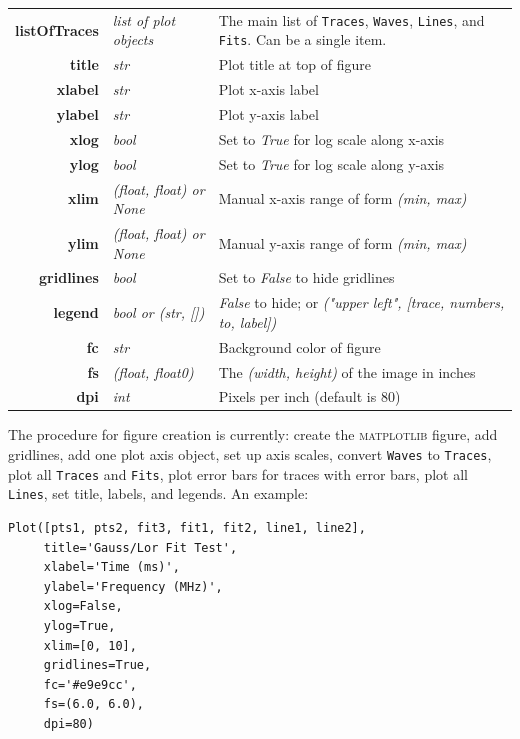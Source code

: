 \documentclass[10pt]{report}
\begin{document}
\begin{table}[hbt]\centering
\begin{tabular}{r l l}
\textbf{listOfTraces} & \textit{list of plot objects} & The main list of \texttt{Traces}, \texttt{Waves}, \texttt{Lines}, and \texttt{Fits}. Can be a single item.  \\
\textbf{title} & \textit{str} & Plot title at top of figure  \\
\textbf{xlabel} & \textit{str} & Plot x-axis label \\
\textbf{ylabel} & \textit{str} & Plot y-axis label \\
\textbf{xlog} & \textit{bool} & Set to \textit{True} for log scale along x-axis \\
\textbf{ylog} & \textit{bool} & Set to \textit{True} for log scale along y-axis \\
\textbf{xlim} & \textit{(float, float) or None} & Manual x-axis range of form \textit{(min, max)} \\
\textbf{ylim} & \textit{(float, float) or None} & Manual y-axis range of form \textit{(min, max)}\\
\textbf{gridlines} & \textit{bool} & Set to \textit{False} to hide gridlines\\
\textbf{legend} & \textit{bool or (str, [])} & \textit{False} to hide; or \textit{("upper left", [trace, numbers, to, label])} \\
\textbf{fc} & \textit{str} & Background color of figure\\
\textbf{fs} & \textit{(float, float0)} & The \textit{(width, height)} of the image in inches\\
\textbf{dpi} & \textit{int} & Pixels per inch (default is 80)\\
\end{tabular}
\end{table}

The procedure for figure creation is currently: create the \textsc{matplotlib} figure, add gridlines, add one plot axis object, set up axis scales, convert \texttt{Waves} to \texttt{Traces}, plot all \texttt{Traces} and \texttt{Fits}, plot error bars for traces with error bars, plot all \texttt{Lines}, set title, labels, and legends. An example:

\begin{lstlisting}[caption=Using Plot()]
Plot([pts1, pts2, fit3, fit1, fit2, line1, line2],
     title='Gauss/Lor Fit Test',
     xlabel='Time (ms)',
     ylabel='Frequency (MHz)',
     xlog=False,
     ylog=True,
     xlim=[0, 10],
     gridlines=True,
     fc='#e9e9cc',
     fs=(6.0, 6.0),
     dpi=80)
\end{lstlisting}
\end{document}

